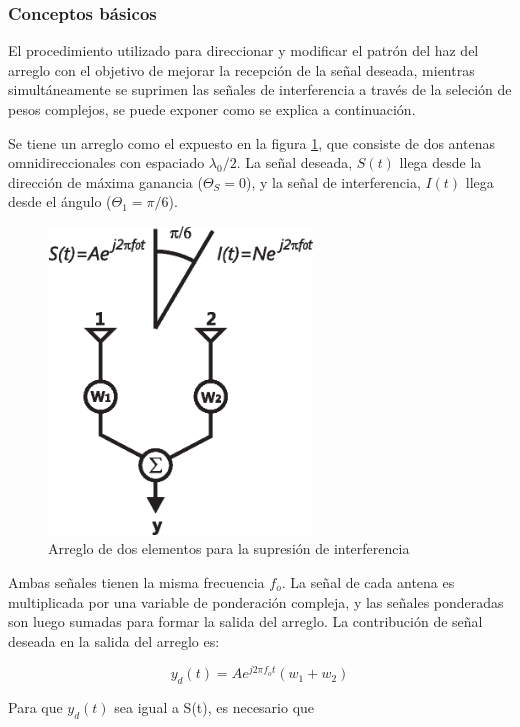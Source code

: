 \subsubsection{Conceptos básicos}

El procedimiento utilizado para direccionar y modificar el patrón del haz del arreglo con el objetivo de mejorar la recepción de la señal deseada, mientras simultáneamente se suprimen las señales de interferencia a través de la seleción de pesos complejos, se puede exponer como se explica a continuación.

Se tiene un arreglo como el expuesto en la figura \ref{fig:example}, que consiste de dos antenas omnidireccionales con espaciado $\lambda_0/2$. La señal deseada, $S(t)$ llega desde la dirección de máxima ganancia ($\Theta_S = 0$), y la señal de interferencia, $I(t)$ llega desde el ángulo ($\Theta_1 = \pi / 6$).

\begin{figure}[htb!]
        \centering
        \includegraphics[width=7cm]{./figures/C02-example}
        \caption{Arreglo de dos elementos para la supresión de interferencia}
        \label{fig:example}
\end{figure}

Ambas señales tienen la misma frecuencia $f_o$. La señal de cada antena es multiplicada por una variable de ponderación compleja, y las señales ponderadas son luego sumadas para formar la salida del arreglo. La contribución de señal deseada en la salida del arreglo es:

\begin{equation}
y_d(t) = A e^{j 2 \pi f_o t}(w_1 + w_2)
\end{equation}

Para que $y_d(t)$ sea igual a S(t), es necesario que


